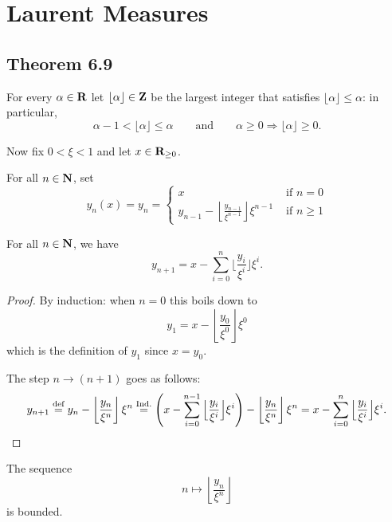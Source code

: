 \section{Laurent Measures}
\subsection{Theorem 6.9}

For every $\alpha\in\mathbf{R}$ let $\lfloor \alpha\rfloor\in\mathbf{Z}$ be the largest integer that satisfies $\lfloor \alpha\rfloor\le \alpha$: in particular,
\[
  \alpha-1 < \lfloor \alpha\rfloor\le \alpha
  \qquad\text{and}\qquad
  \alpha\geq 0 \Longrightarrow \lfloor \alpha\rfloor \geq 0.
\]

Now fix $0< \xi<1$ and let $x\in\mathbf{R}_{\geq 0}$. 

\begin{definition}
  \label{theta.y}
  \leanok
	For all $n\in\mathbf{N}$, set
	\[
		y_n(x)=y_n=
		\begin{cases}
			x&\text{ if } n = 0 \\
			y_{n-1} - \left\lfloor \frac{y_{n-1}}{\xi^{n-1}} \right\rfloor \xi^{n-1} & \text{ if } n \ge 1
		\end{cases}
	\]
\end{definition}

\begin{lemma}
  \label{theta.finite_sum}
  \leanok
  For all $n\in\mathbf{N}$, we have
  \[
    y_{n+1} = x - \sum_{i=0}^n \Big\lfloor \frac{y_i}{\xi^i} \Big\rfloor \xi^i.
  \]
\end{lemma}

\begin{proof}
  \leanok
  By induction: when $n=0$ this boils down to
  \[
    y_1=x-\left\lfloor \frac{y_0}{\xi^0}\right\rfloor \xi^0
  \]
  which is the definition of $y_1$ since $x=y_0$.

	The step $n\to (n+1)$ goes as follows:
	\[
		y_{n+1} \overset{\text{def}}{=} y_{n} - \left\lfloor \frac{y_{n}}{\xi^{n}} \right\rfloor \xi^{n}
		\overset{\text{Ind.}}{=} \left(x - \sum_{i=0}^{n-1} \Big\lfloor \frac{y_i}{\xi^i} \Big\rfloor\xi^i\right) -
		\left\lfloor \frac{y_{n}}{\xi^{n}} \right\rfloor\xi^{n}
		= x - \sum_{i=0}^n \Big\lfloor \frac{y_i}{\xi^i} \Big\rfloor \xi^i.
		\qedhere
	\]
\end{proof}

\begin{lemma}
  \label{theta.bounded}
	The sequence
	\[
		n \mapsto \left\lfloor \frac{y_n}{\xi^n} \right\rfloor
	\]
	is bounded.
\end{lemma}

